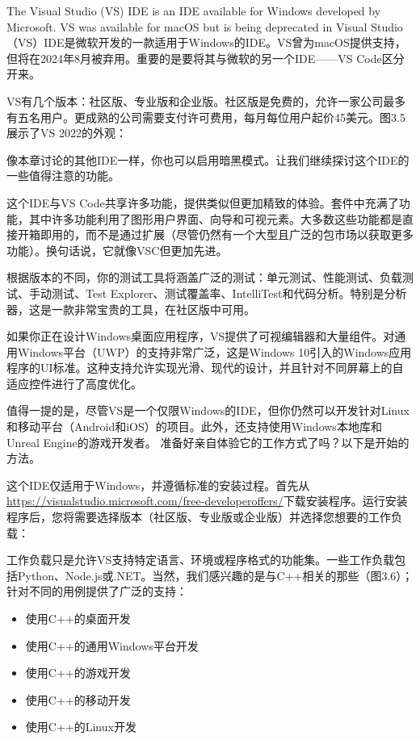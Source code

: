 
The Visual Studio (VS) IDE is an IDE available for Windows developed by Microsoft. VS was available for macOS but is being deprecated in Visual Studio（VS）IDE是微软开发的一款适用于Windows的IDE。VS曾为macOS提供支持，但将在2024年8月被弃用。重要的是要将其与微软的另一个IDE——VS Code区分开来。

VS有几个版本：社区版、专业版和企业版。社区版是免费的，允许一家公司最多有五名用户。更成熟的公司需要支付许可费用，每月每位用户起价45美元。图3.5展示了VS 2022的外观：


像本章讨论的其他IDE一样，你也可以启用暗黑模式。让我们继续探讨这个IDE的一些值得注意的功能。


这个IDE与VS Code共享许多功能，提供类似但更加精致的体验。套件中充满了功能，其中许多功能利用了图形用户界面、向导和可视元素。大多数这些功能都是直接开箱即用的，而不是通过扩展（尽管仍然有一个大型且广泛的包市场以获取更多功能）。换句话说，它就像VSC但更加先进。

根据版本的不同，你的测试工具将涵盖广泛的测试：单元测试、性能测试、负载测试、手动测试、Test Explorer、测试覆盖率、IntelliTest和代码分析。特别是分析器，这是一款非常宝贵的工具，在社区版中可用。

如果你正在设计Windows桌面应用程序，VS提供了可视编辑器和大量组件。对通用Windows平台（UWP）的支持非常广泛，这是Windows 10引入的Windows应用程序的UI标准。这种支持允许实现光滑、现代的设计，并且针对不同屏幕上的自适应控件进行了高度优化。

值得一提的是，尽管VS是一个仅限Windows的IDE，但你仍然可以开发针对Linux和移动平台（Android和iOS）的项目。此外，还支持使用Windows本地库和Unreal Engine的游戏开发者。
准备好亲自体验它的工作方式了吗？以下是开始的方法。


这个IDE仅适用于Windows，并遵循标准的安装过程。首先从\url{https://visualstudio.microsoft.com/free-developeroffers/}下载安装程序。运行安装程序后，您将需要选择版本（社区版、专业版或企业版）并选择您想要的工作负载：


工作负载只是允许VS支持特定语言、环境或程序格式的功能集。一些工作负载包括Python、Node.js或.NET。当然，我们感兴趣的是与C++相关的那些（图3.6）；针对不同的用例提供了广泛的支持：

\begin{itemize}
\item
使用C++的桌面开发

\item
使用C++的通用Windows平台开发

\item
使用C++的游戏开发

\item
使用C++的移动开发

\item
使用C++的Linux开发
\end{itemize}

